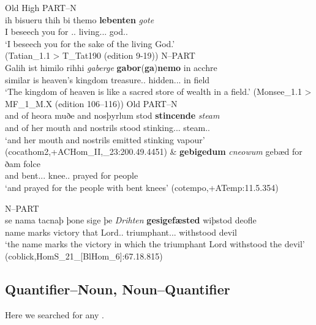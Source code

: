 \documentclass[output=paper,colorlinks,citecolor=brown,draft]{langscibook}
\begin{document}
\ea\label{OHGPartN}
\noindent Old High 
\ea
PART--N\\
\gll ih bisueru thih bi themo \textbf{lebenten} \textit{gote}\\
I beseech you for \DEF.\DAT.\SG{} living.\DAT.\SG.\WK{} god.\DAT.\SG{}\\
 \glt ‘I beseech you for the sake of the living God.’\\ (Tatian\_1.1 > T\_Tat190 (edition 9-19))
\ex\label{OHGNPart}
N--PART\\
\gll Galih ist himilo rihhi \textit{gaberge} \textbf{gabor}(\textbf{ga})\textbf{nemo} in acchre\\
similar is heaven’s kingdom treasure.\DAT.\SG{} hidden.\DAT.\SG.\STR{} in field\\
\glt ‘The kingdom of heaven is like a sacred store of wealth in a field.’ (Monsee\_1.1 > MF\_1\_M.X (edition 106--116))
\z
\ex\label{OEPartN}
\noindent Old 
\ea PART--N\\
\ea
\gll and of heora muðe and nosþyrlum stod \textbf{stincende} \textit{steam}\\
and of her mouth and nostrils stood stinking.\NOM.\SG.\STR{} steam.\NOM.\SG{}\\
\glt ‘and her mouth and nostrils emitted stinking vapour’ (cocathom2,+ACHom\_II,\_23:200.49.4451)
\ex\label{OEPartN2}
\gll \& \textbf{gebigedum} \textit{cneowum} gebæd for ðam folce\\
	and bent.\DAT.\PL.\STR{} knee.\DAT.\PL{} prayed for \DEF{} people\\
\glt ‘and prayed for the people with bent knees’ (cotempo,+ATemp:11.5.354)
\z

\ex\label{OENPart}
N--PART\\
\gll se nama tacnaþ þone sige þe \textit{Drihten} \textbf{gesigefæsted} wiþstod deofle\\
\DEF{} name marks \DEF{} victory that Lord.\NOM.\SG{} triumphant.\NOM.\SG.\STR{} withstood devil\\
\glt ‘the name marks the victory in which the triumphant Lord withstood the devil’ (coblick,HomS\_21\_[BlHom\_6]:67.18.815)
\z
\z

\subsection{Quantifier–Noun, Noun–Quantifier}\label{ssectQNNQ}
Here we searched for any .
\end{document}
